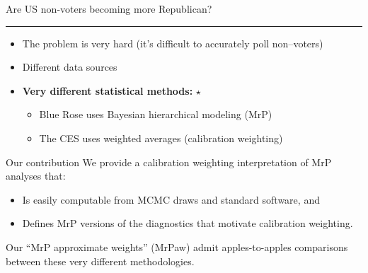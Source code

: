 
\begin{frame}{Are US non-voters becoming more Republican?}

\vspace{1em}
%
\hrule
\begin{itemize}
\item The problem is very hard (it's difficult to accurately poll non--voters)
\item Different data sources
%
%
\item \textbf{Very different statistical methods:} $\star$
\begin{itemize}
    \item Blue Rose uses Bayesian hierarchical modeling (MrP)
    \item The CES uses weighted averages (calibration weighting)
\end{itemize}
%
\end{itemize}

\begin{block}{Our contribution}
    We provide a calibration weighting interpretation of MrP analyses that:
\begin{itemize}
    \item Is easily computable from MCMC draws and standard software, and
    \item Defines MrP versions of the diagnostics that motivate calibration weighting.
\end{itemize}
%
Our ``MrP approximate weights'' (MrPaw) admit apples-to-apples comparisons between
these very different methodologies.
%
\end{block}


\end{frame}
